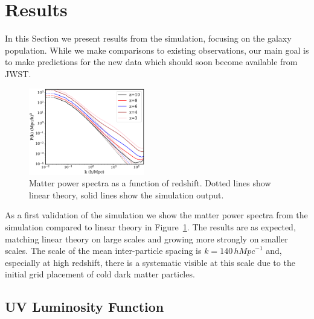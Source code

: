 \documentclass[fleqn,usenatbib]{mnras}
\newcommand{\hMpc}{\,h\unit{Mpc}^{-1}}
\begin{document}
\section{Results}
\label{sec:results}

In this Section we present results from the simulation, focusing on the galaxy population. While we make comparisons to existing observations, our main goal is to make predictions for the new data which should soon become available from JWST.

\begin{figure}
\centering
  \includegraphics[width=0.45\textwidth]{plots/matterpower.pdf}
  \caption{Matter power spectra as a function of redshift. Dotted lines show linear theory, solid lines show the simulation output.}
  \label{fig:matterpower}
\end{figure}

As a first validation of the simulation we show the matter power spectra from the simulation compared to linear theory in Figure~\ref{fig:matterpower}. The results are as expected, matching linear theory on large scales and growing more strongly on smaller scales. The scale of the mean inter-particle spacing is $k = 140 \hMpc$ and, especially at high redshift, there is a systematic visible at this scale due to the initial grid placement of cold dark matter particles.

\subsection{UV Luminosity Function}
\label{sec:uvlf}
\end{document}
